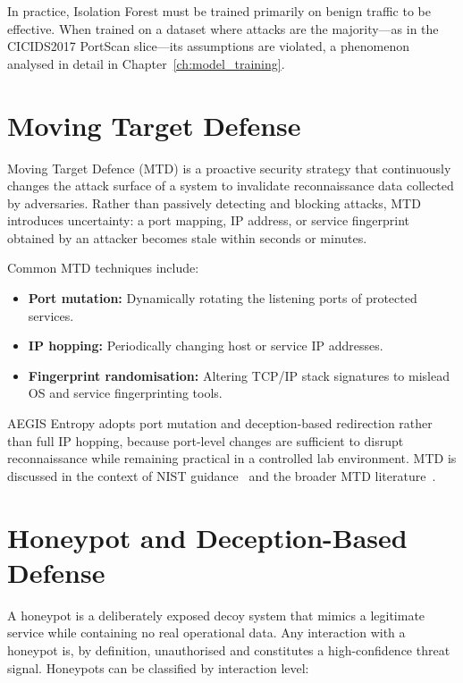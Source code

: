 \documentclass[12pt,a4paper]{report}
\begin{document}
In practice, Isolation Forest must be trained primarily on benign traffic to be effective. When trained on a dataset where attacks are the majority---as in the CICIDS2017 PortScan slice---its assumptions are violated, a phenomenon analysed in detail in Chapter~\ref{ch:model_training}.

\section{Moving Target Defense}\label{sec:mtd}

Moving Target Defence (MTD) is a proactive security strategy that continuously changes the attack surface of a system to invalidate reconnaissance data collected by adversaries. Rather than passively detecting and blocking attacks, MTD introduces uncertainty: a port mapping, IP address, or service fingerprint obtained by an attacker becomes stale within seconds or minutes.

Common MTD techniques include:

\begin{itemize}
    \item \textbf{Port mutation:} Dynamically rotating the listening ports of protected services.
    \item \textbf{IP hopping:} Periodically changing host or service IP addresses.
    \item \textbf{Fingerprint randomisation:} Altering TCP/IP stack signatures to mislead OS and service fingerprinting tools.
\end{itemize}

AEGIS Entropy adopts port mutation and deception-based redirection rather than full IP hopping, because port-level changes are sufficient to disrupt reconnaissance while remaining practical in a controlled lab environment. MTD is discussed in the context of NIST guidance~\cite{nist2020} and the broader MTD literature~\cite{jajodia2011}.

\section{Honeypot and Deception-Based Defense}\label{sec:honeypot}

A honeypot is a deliberately exposed decoy system that mimics a legitimate service while containing no real operational data. Any interaction with a honeypot is, by definition, unauthorised and constitutes a high-confidence threat signal. Honeypots can be classified by interaction level:
\end{document}
